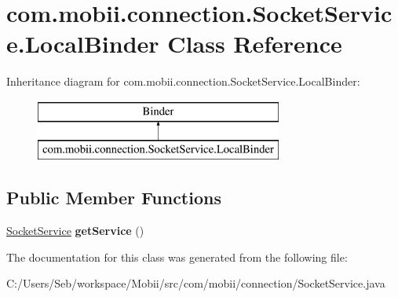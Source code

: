 \hypertarget{classcom_1_1mobii_1_1connection_1_1_socket_service_1_1_local_binder}{\section{com.\-mobii.\-connection.\-Socket\-Service.\-Local\-Binder Class Reference}
\label{classcom_1_1mobii_1_1connection_1_1_socket_service_1_1_local_binder}
}
Inheritance diagram for com.\-mobii.\-connection.\-Socket\-Service.\-Local\-Binder\-:\begin{figure}[H]
\begin{center}
\leavevmode
\includegraphics[height=2.000000cm]{classcom_1_1mobii_1_1connection_1_1_socket_service_1_1_local_binder}
\end{center}
\end{figure}
\subsection*{Public Member Functions}
\begin{DoxyCompactItemize}
\item 
\hypertarget{classcom_1_1mobii_1_1connection_1_1_socket_service_1_1_local_binder_a0b75a32fab008d82a8dba86790f59ddb}{\hyperlink{classcom_1_1mobii_1_1connection_1_1_socket_service}{Socket\-Service} {\bfseries get\-Service} ()}\label{classcom_1_1mobii_1_1connection_1_1_socket_service_1_1_local_binder_a0b75a32fab008d82a8dba86790f59ddb}

\end{DoxyCompactItemize}


The documentation for this class was generated from the following file\-:\begin{DoxyCompactItemize}
\item 
C\-:/\-Users/\-Seb/workspace/\-Mobii/src/com/mobii/connection/Socket\-Service.\-java\end{DoxyCompactItemize}
